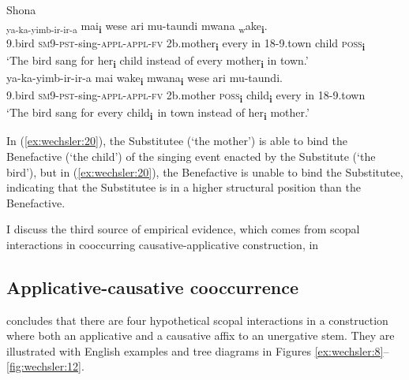 \documentclass[output=paper,modfonts,nonflat,colorlinks,citecolor=brown]{langsci/langscibook}
\begin{document}
\ea\label{ex:wechsler:20}
Shona\\
\ea
{} {\textsubscript{ya-ka-yimb-ir-ir-a} } {mai}\textbf{{\textsubscript{i}}} {wese} {ari}  {{mu-taundi}}  {{mwana}} {\textsubscript{w}}{ake}\textbf{{\textsubscript{i}}}.\\
 9.bird  \textsc{sm}9-\textsc{pst}{}-sing-\textsc{appl-appl-fv}  2b.mother\textbf{\textsubscript{i}}  every  in  {18-9.town}  {child}  \textsc{poss}\textbf{\textsubscript{i}}\\
\glt `The bird sang for her\textbf{\textsubscript{i}} child instead of every mother\textbf{\textsubscript{i}} in town.’   \\

\ex
{} {ya-ka-yimb-ir-ir-a} {mai} {wake\textbf{\textsubscript{i}}}  {{mwana\textbf{\textsubscript{i}}}}  {{wese}} {ari}  {{mu-taundi}}.\\
 9.bird  \textsc{sm}9-\textsc{pst}{}-sing-\textsc{appl-appl-fv}  2b.mother  \textsc{poss}\textbf{\textsubscript{i}}  {child\textbf{\textsubscript{i}}}  {every}  in  {18-9.town}\\
\glt `The bird sang for every child\textbf{\textsubscript{i}}\textsubscript{~}in town instead of her\textbf{\textsubscript{i}} mother.'
\z
\z

In (\ref{ex:wechsler:20}), the Substitutee (‘the mother’) is able to bind the Benefactive (‘the child’) of the singing event enacted by the Substitute (‘the bird’), but in (\ref{ex:wechsler:20}), the Benefactive is unable to bind the Substitutee, indicating that the Substitutee is in a higher structural position than the Benefactive. 



I discuss the third source of empirical evidence, which comes from scopal interactions in cooccurring causative-applicative construction, in 

\subsection{Applicative-causative cooccurrence}\label{sec:wechsler:3.4}

\citet{Wechsler2016} concludes that there are four hypothetical scopal interactions in a construction where both an applicative and a causative affix to an unergative stem. They are illustrated with English examples and tree diagrams in Figures \ref{ex:wechsler:8}--\ref{fig:wechsler:12}. 
 
\end{document}
